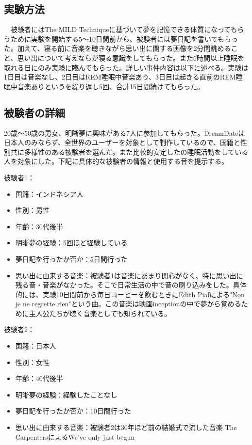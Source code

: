 \subsection{実験方法}
　被験者にはThe MILD Techniqueに基づいて夢を記憶できる体質になってもらうために実験を開始する5〜10日間前から、被験者には夢日記を書いてもらった。加えて、寝る前に音楽を聴きながら思い出に関する画像を2分間眺めること、思い出について考えならが寝る意識をしてもらった。また6時間以上睡眠を取れる日にのみ実験に臨んでもらった。詳しい事件内容は以下に述べる。実験は1日目は音楽なし、2日目はREM睡眠中音楽あり、3日目は起きる直前のREM睡眠中音楽ありというを繰り返し5回、合計15日間続けてもらった。

\subsection{被験者の詳細}
20歳〜50歳の男女、明晰夢に興味がある7人に参加してもらった。DreamDateは日本人のみならず、全世界のユーザーを対象として制作しているので、国籍と性別共に多様性のある被験者を選んだ。また比較的安定したの睡眠活動をしている人を対象にした。下記に具体的な被験者の情報と使用する音を提示する。

被験者1：
\begin{itemize}
\item 国籍：インドネシア人
\item 性別：男性
\item 年齢：30代後半
\item 明晰夢の経験：5回ほど経験している
\item 夢日記を行ったか否か：5日間行った
\item 思い出に由来する音楽：被験者1は音楽にあまり関心がなく、特に思い出に残る音・音楽がなかった。そこで日常生活の中で音の刷り込みをした。具体的には、実験10日間前から毎日コーヒーを飲むときにEdith Piafによる"Non je ne regrette rien"という曲。この音楽は映画inceptionの中で夢から覚めるために主人公たちが聴く音楽としても知られている。

\end{itemize}

被験者2：
\begin{itemize}
\item 国籍：日本人
\item 性別：女性
\item 年齢：40代後半
\item 明晰夢の経験：経験したことなし
\item 夢日記を行ったか否か：10日間行った
\item 思い出に由来する音楽：被験者2は30年ほど前の結婚式で流した音楽 The CarpentersによるWe've only just begun
\end{itemize}

